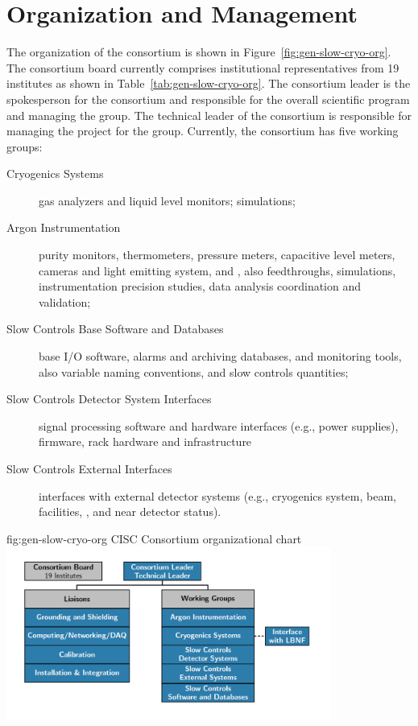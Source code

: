 \section{Organization and Management}
\label{sec:cisc-slow-controls-org}

The organization of the  consortium is shown in
 Figure~\ref{fig:gen-slow-cryo-org}. The  consortium board currently comprises institutional representatives from 19 institutes as shown in Table~\ref{tab:gen-slow-cryo-org}. The consortium leader is the spokesperson for the consortium and responsible for the overall scientific program and managing the group. The technical leader of the consortium is responsible for managing the project for the group. Currently, the
consortium has five working groups:
\begin{description}
 \item[Cryogenics Systems] gas analyzers and liquid level
  monitors;  simulations;
  
 \item[Argon Instrumentation] purity monitors, thermometers, pressure meters, capacitive level meters, cameras and light emitting system, and , also feedthroughs, \efield simulations, instrumentation precision studies,  data analysis coordination and validation; 
 
 \item [Slow Controls Base Software and Databases]  base I/O software, alarms and archiving databases, and monitoring tools, also 
   variable naming conventions, and slow controls quantities;
 \item [Slow Controls Detector System Interfaces] signal processing software and hardware interfaces (e.g., power supplies), firmware, rack hardware and infrastructure   
 \item [Slow Controls External Interfaces] interfaces with external detector systems (e.g., cryogenics system, beam, facilities, , and near detector status).
\end{description}

\begin{dunefigure}{fig:gen-slow-cryo-org}
{CISC Consortium organizational chart}
\includegraphics[width=0.8\textwidth]{graphics/cisc_org_20190716_zoomedin.png}
\end{dunefigure}


